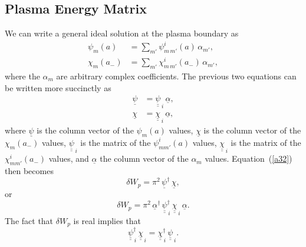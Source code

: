 \documentclass[12pt,prb,aps]{revtex4-1}
\begin{document}
\subsection{Plasma Energy Matrix}
We can write a general ideal solution at the plasma boundary as
\begin{align}
\psi_m(a) &= \sum_{m'}\psi_{m\,m'}^i(a)\,\alpha_{m'},\\[0.5ex]
\chi_m(a_-) &= \sum_{m'}\chi_{m\,m'}^i(a_-)\,\alpha_{m'},
\end{align}
where the $\alpha_m$ are arbitrary complex coefficients. 
The previous two equations can be written more succinctly as
\begin{align}\label{e41}
\underline{\psi}&= \underline{\underline{\psi}}_{\,i}\,\underline{\alpha},\\[0.5ex]
\underline{\chi}&= \underline{\underline{\chi}}_{\,i}\,\underline{\alpha},\label{e42}
\end{align}
where $\underline{\psi}$ is the column vector of the $\psi_m(a)$ values, $\underline{\chi}$ is the column vector of the $\chi_m(a_-)$ values,
$\underline{\underline{\psi}}_{\,i}$ is the matrix of the $\psi_{mm'}^i(a)$ values, $\underline{\underline{\chi}}_{\,i}$ is the matrix of the $\chi_{mm'}^i(a_-)$ values,
and $\underline{\alpha}$ the column vector of the $\alpha_m$ values. 
Equation~(\ref{a32}) then becomes
\begin{equation}
\delta W_p=\pi^2\,\underline{\psi}^\dag\,\underline{\chi},
\end{equation} 
or
\begin{equation}\label{e44}
\delta W_p =\pi^2\, \underline{\alpha}^\dag\,\underline{\underline{\psi}}^{\dag}_{\,i}\,\underline{\underline{\chi}}_{\,i}\,\underline{\alpha}.
\end{equation}
The fact that $\delta W_p$ is real implies that
 \begin{equation}\label{e47}
 \underline{\underline{\psi}}^{\dag}_{\,i}\,\underline{\underline{\chi}}_{\,i}= \underline{\underline{\chi}}^{\dag}_{\,i}\,\underline{\underline{\psi}}_{\,i}.
 \end{equation}
\end{document}
